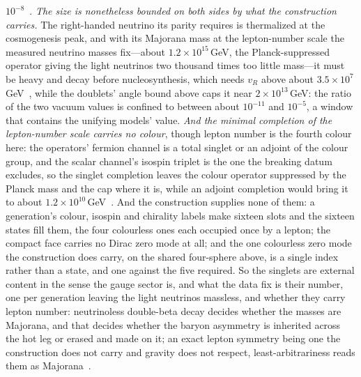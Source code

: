 \documentclass[11pt]{article}
\begin{document}
$10^{-8}$~\cite{HallHarigaya2018}. \emph{The size is nonetheless bounded on both sides by what the construction carries.} The right-handed neutrino its parity requires is thermalized at the cosmogenesis peak, and with its Majorana mass at the lepton-number scale the measured neutrino masses fix---about $1.2\times10^{15}$\,GeV, the Planck-suppressed operator giving the light neutrinos two thousand times too little mass---it must be heavy and decay before nucleosynthesis, which needs $v_R$ above about $3.5\times10^{7}$\,GeV~\cite{JanzenCRcosmology}, while the doublets' angle bound above caps it near $2\times10^{13}$\,GeV: the ratio of the two vacuum values is confined to between about $10^{-11}$ and $10^{-5}$, a window that contains the unifying models' value. \emph{And the minimal completion of the lepton-number scale carries no colour}, though lepton number is the fourth colour here: the operators' fermion channel is a total singlet or an adjoint of the colour group, and the scalar channel's isospin triplet is the one the breaking datum excludes, so the singlet completion leaves the colour operator suppressed by the Planck mass and the cap where it is, while an adjoint completion would bring it to about $1.2\times10^{10}$\,GeV~\cite{JanzenCRcosmology}. And the construction supplies none of them: a generation's colour, isospin and chirality labels make sixteen slots and the sixteen states fill them, the four colourless ones each occupied once by a lepton; the compact face carries no Dirac zero mode at all; and the one colourless zero mode the construction does carry, on the shared four-sphere above, is a single index rather than a state, and one against the five required. So the singlets are external content in the sense the gauge sector is, and what the data fix is their number, one per generation leaving the light neutrinos massless, and whether they carry lepton number: neutrinoless double-beta decay decides whether the masses are Majorana, and that decides whether the baryon asymmetry is inherited across the hot leg or erased and made on it; an exact lepton symmetry being one the construction does not carry and gravity does not respect, least-arbitrariness reads them as Majorana~\cite{JanzenCosmogenesis}.
\end{document}
